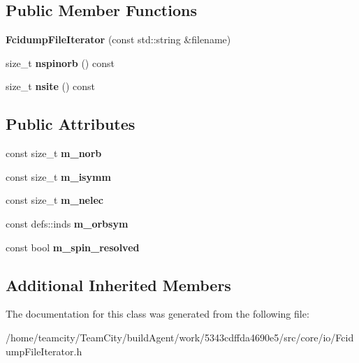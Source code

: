 \subsection*{Public Member Functions}
\begin{DoxyCompactItemize}
\item 
{\bfseries Fcidump\+File\+Iterator} (const std\+::string \&filename)\hypertarget{classFcidumpFileIterator_ab9e007160da2a4adc8d1e5ecf9f9b3af}{}\label{classFcidumpFileIterator_ab9e007160da2a4adc8d1e5ecf9f9b3af}

\item 
size\+\_\+t {\bfseries nspinorb} () const \hypertarget{classFcidumpFileIterator_a919af803234a9be8ff4554033b78e029}{}\label{classFcidumpFileIterator_a919af803234a9be8ff4554033b78e029}

\item 
size\+\_\+t {\bfseries nsite} () const \hypertarget{classFcidumpFileIterator_ae4cfbdf3629159d5c7b1e46ad27e95b4}{}\label{classFcidumpFileIterator_ae4cfbdf3629159d5c7b1e46ad27e95b4}

\end{DoxyCompactItemize}
\subsection*{Public Attributes}
\begin{DoxyCompactItemize}
\item 
const size\+\_\+t {\bfseries m\+\_\+norb}\hypertarget{classFcidumpFileIterator_a7f1f55d8a94c5d80fbdebf9dfe974792}{}\label{classFcidumpFileIterator_a7f1f55d8a94c5d80fbdebf9dfe974792}

\item 
const size\+\_\+t {\bfseries m\+\_\+isymm}\hypertarget{classFcidumpFileIterator_af22d7b2d450c4764267b89791cbb4bff}{}\label{classFcidumpFileIterator_af22d7b2d450c4764267b89791cbb4bff}

\item 
const size\+\_\+t {\bfseries m\+\_\+nelec}\hypertarget{classFcidumpFileIterator_a8a37433731cd37c3e08541118b5f6be2}{}\label{classFcidumpFileIterator_a8a37433731cd37c3e08541118b5f6be2}

\item 
const defs\+::inds {\bfseries m\+\_\+orbsym}\hypertarget{classFcidumpFileIterator_a65001bd49be378d23c6a39478604a190}{}\label{classFcidumpFileIterator_a65001bd49be378d23c6a39478604a190}

\item 
const bool {\bfseries m\+\_\+spin\+\_\+resolved}\hypertarget{classFcidumpFileIterator_a804097da6bfec3017cd577f9eeb8ae42}{}\label{classFcidumpFileIterator_a804097da6bfec3017cd577f9eeb8ae42}

\end{DoxyCompactItemize}
\subsection*{Additional Inherited Members}


The documentation for this class was generated from the following file\+:\begin{DoxyCompactItemize}
\item 
/home/teamcity/\+Team\+City/build\+Agent/work/5343cdffda4690e5/src/core/io/Fcidump\+File\+Iterator.\+h\end{DoxyCompactItemize}
